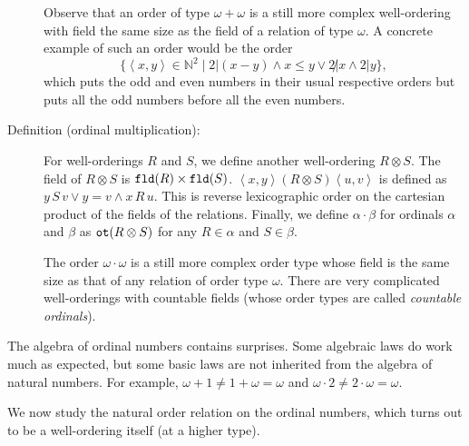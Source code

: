 \documentclass[12pt]{book}
\begin{document}
\begin{description}
Observe that an order of type $\omega+\omega$ is a still more complex
well-ordering with field the same size as the field of a relation of
type $\omega$.  A concrete example of such an order would be the order
$$\{\left<x,y\right> \in {\mathbb N}^2 \mid 2|(x-y) \wedge x \leq y
\vee 2\not| x \wedge 2|y\},$$ which puts the odd and even numbers in
their usual respective orders but puts all the odd numbers before all
the even numbers.

\item[Definition (ordinal multiplication):] For well-orderings $R$ and $S$, we define
another well-ordering $R \otimes S$.  The field of $R \otimes S$ is
${\tt fld}(R) \times {\tt fld}(S)$.  $\left<x,y\right> (R \otimes S)
\left<u,v\right>$ is defined as $y\,S\,v \vee y=v \wedge x\,R\,u$.
This is reverse lexicographic order on the cartesian product of the
fields of the relations.   Finally, we define $\alpha \cdot \beta$ for
ordinals $\alpha$ and $\beta$ as ${\tt ot}(R \otimes S)$ for any $R \in
\alpha$ and $S \in \beta$. 

The order $\omega\cdot\omega$ is a still more complex order type whose
field is the same size as that of any relation of order type $\omega$.
There are very complicated well-orderings with countable fields (whose
order types are called {\em countable ordinals\/}).

\end{description}

The algebra of ordinal numbers contains surprises.  Some algebraic
laws do work much as expected, but some basic laws are not inherited
from the algebra of natural numbers.  For example, $\omega+1 \neq
1+\omega = \omega$ and $\omega\cdot 2 \neq 2 \cdot \omega = \omega$.


We now study the natural order relation on the ordinal numbers, which
turns out to be a well-ordering itself (at a higher type).
\end{document}
